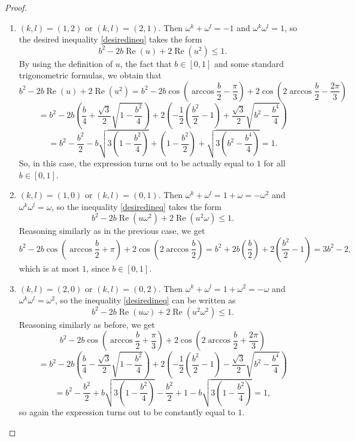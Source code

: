 \documentclass[12pt, a4paper]{article}
\theoremstyle{plain} %
\theoremstyle{definition} %
\theoremstyle{remark} %
\DeclareMathOperator{\re}{Re}
\begin{document}
\begin{proof}
\begin{enumerate}
\item $(k, l)=(1, 2)$ or $(k, l) = (2, 1)$. Then $\omega^k + \omega^l=-1$ and $\omega^k \omega^l = 1$, so the desired inequality \eqref{desiredineq} takes the form
$$b^2 - 2b\re(u) + 2\re(u^2) \leq 1.$$
By using the definition of $u$, the fact that $b \in [0, 1]$ and some standard trigonometric formulas, we obtain that
$$b^2 - 2b\re(u) + 2\re(u^2) = b^2 - 2b \cos \left ( \arccos{\frac{b}{2}} - \frac{\pi}{3} \right ) + 2 \cos \left (2\arccos{\frac{b}{2}} - \frac{2\pi}{3} \right ) $$
$$=b^2 - 2b \left( \frac{b}{4} + \frac{\sqrt{3}}{2} \sqrt{1 - \frac{b^2}{4}} \right) + 2 \left( -\frac{1}{2} \left( \frac{b^2}{2} - 1 \right) + \frac{\sqrt{3}}{2} \sqrt{b^2 - \frac{b^4}{4}} \right)$$
$$=b^2 - \frac{b^2}{2} - b\sqrt{3\left ( 1 - \frac{b^2}{4} \right )} + \left ( 1 -\frac{b^2}{2} \right ) + \sqrt{3\left ( b^2 - \frac{b^4}{4} \right )} = 1.$$
So, in this case, the expression turns out to be actually equal to $1$ for all $b \in [0, 1]$.
\item $(k, l) = (1, 0)$ or $(k, l) = (0, 1)$. Then $\omega ^k + \omega^l = 1 + \omega = -\omega^2$ and $\omega^k \omega^l = \omega$, so the inequality \eqref{desiredineq} takes the form
$$b^2  - 2b \re \left (u \omega^2 \right ) + 2 \re \left (u^2\omega \right ) \leq 1.$$
Reasoning similarly as in the previous case, we get
$$b^2  - 2b \cos \left (\arccos{\frac{b}{2}} + \pi \right ) + 2 \cos \left (2\arccos{\frac{b}{2}} \right ) = b^2  + 2b \left ( \frac{b}{2} \right ) + 2 \left ( \frac{b^2}{2} - 1 \right ) = 3b^2 - 2,$$
which is at most $1$, since $b \in [0, 1]$.
\item $(k, l) = (2, 0)$ or $(k, l) = (0, 2)$. Then $\omega ^k + \omega^l = 1 + \omega^2 = -\omega$ and $\omega^k \omega^l = \omega^2$, so the inequality \eqref{desiredineq} can be written as
$$b^2  - 2b \re \left (u \omega \right ) + 2 \re \left (u^2\omega^2 \right ) \leq 1.$$
Reasoning similarly as before, we get
$$b^2  - 2b \cos \left (\arccos{\frac{b}{2}} + \frac{\pi}{3} \right ) + 2 \cos \left (2\arccos{\frac{b}{2}}+\frac{2\pi}{3} \right )$$
$$=b^2 - 2b \left( \frac{b}{4} - \frac{\sqrt{3}}{2} \sqrt{1 - \frac{b^2}{4}} \right) + 2 \left( -\frac{1}{2} \left( \frac{b^2}{2} - 1 \right) - \frac{\sqrt{3}}{2} \sqrt{b^2 - \frac{b^4}{4}} \right)$$
$$=b^2 - \frac{b^2}{2} + b\sqrt{3\left ( 1 - \frac{b^2}{4} \right )} - \frac{b^2}{2} + 1 - b\sqrt{3\left ( 1 - \frac{b^2}{4} \right )} = 1,$$
so again the expression turns out to be constantly equal to $1$. 


\end{enumerate}
\end{proof}
\end{document}
